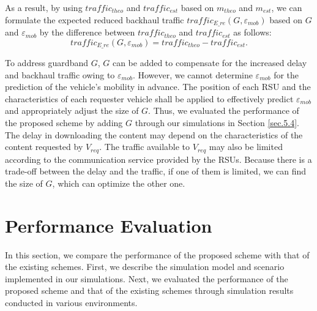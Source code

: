 \documentclass[electronics,aricle,accept,pdftex,moreauthors]{Definitions/mdpi}
\begin{document}
As a result, by using $traffic_{theo}$ and $traffic_{est}$ based on $m_{theo}$ and $m_{est}$, we can formulate the expected reduced backhaul traffic ${traffic}_{E\_re}(G, \varepsilon_{mob})$ based on $G$ and $\varepsilon_{mob}$ by the difference between $traffic_{theo}$ and $traffic_{est}$ as follows:
\begin{equation}
{traffic}_{E\_re}(G, \varepsilon_{mob}) = traffic_{theo}-traffic_{est}.
\end{equation}

To address guardband $G$, $G$ can be added to compensate for the increased delay and backhaul traffic owing to $\varepsilon_{mob}$. 
However, we cannot determine $\varepsilon_{mob}$ for the prediction of the vehicle's mobility in advance. 
The position of each RSU and the characteristics of each requester vehicle shall be applied to effectively predict $\varepsilon_{mob}$ and appropriately adjust the size of $G$.
Thus, we evaluated the performance of the proposed scheme by adding $G$ through our simulations in Section \ref{sec.5.4}.
The delay in downloading the content may depend on the characteristics of the content requested by ${V}_{req}$.
The traffic available to ${V}_{req}$ may also be limited according to the communication service provided by the RSUs.
Because there is a trade-off between the delay and the traffic, if one of them is limited, we can find the size of $G$, which can optimize the other one.

\section{Performance Evaluation} \label{sec5}
In this section, we compare the performance of the proposed scheme with that of the existing schemes. First, we describe the simulation model and scenario implemented in our simulations. Next, we evaluated the performance of the proposed scheme and that of the existing schemes through simulation results conducted in various environments.
\end{document}
